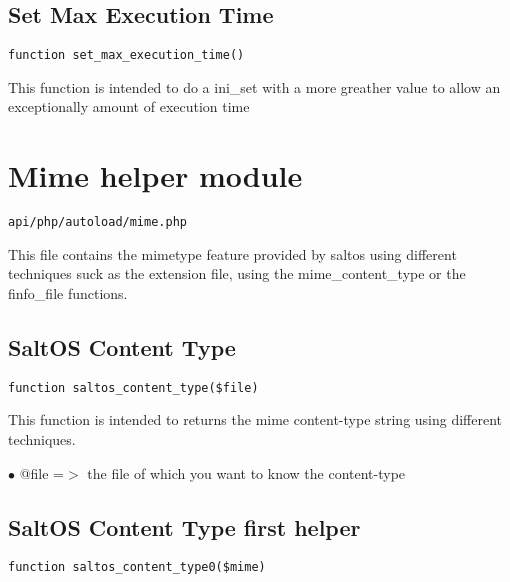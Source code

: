 \documentclass[a4paper]{book}
\begin{document}
\hypertarget{toc209}{}
\subsection{Set Max Execution Time}

\begin{lstlisting}
function set_max_execution_time()
\end{lstlisting}

This function is intended to do a ini\_set with a more greather value to allow an
exceptionally amount of execution time

\hypertarget{toc210}{}
\section{Mime helper module}

\begin{lstlisting}
api/php/autoload/mime.php
\end{lstlisting}

This file contains the mimetype feature provided by saltos using different techniques
suck as the extension file, using the mime\_content\_type or the finfo\_file functions.

\hypertarget{toc211}{}
\subsection{SaltOS Content Type}

\begin{lstlisting}
function saltos_content_type($file)
\end{lstlisting}

This function is intended to returns the mime content-type string using different
techniques.

\begin{compactitem}
\item[\color{myblue}$\bullet$] @file =$>$ the file of which you want to know the content-type
\end{compactitem}

\hypertarget{toc212}{}
\subsection{SaltOS Content Type first helper}

\begin{lstlisting}
function saltos_content_type0($mime)
\end{lstlisting}
\end{document}
